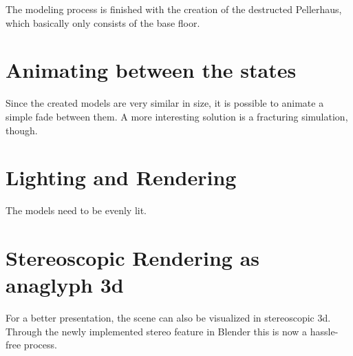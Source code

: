 The modeling process is finished with the creation of the destructed Pellerhaus, which basically only consists of the base floor.

\section{Animating between the states}

Since the created models are very similar in size, it is possible to animate a simple fade between them.
A more interesting solution is a fracturing simulation, though.

\section{Lighting and Rendering}

The models need to be evenly lit.

\section{Stereoscopic Rendering as anaglyph 3d}

For a better presentation, the scene can also be visualized in stereoscopic 3d. Through the newly implemented stereo feature in Blender this is now a hassle-free process.